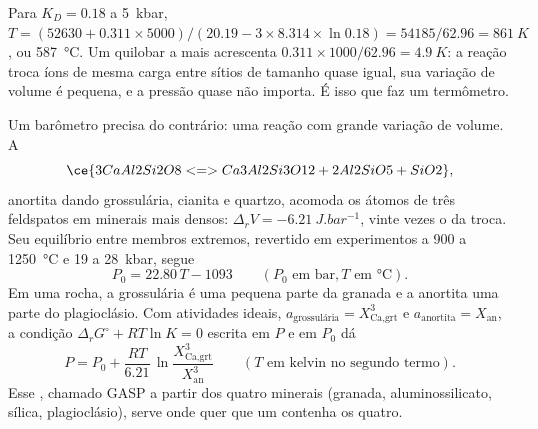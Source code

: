\begin{omfigure}
\centering
{}
\par{}
\end{omfigure}

Para $K_D = 0.18$ a \qty{5}{kbar}, $T = (52630 + 0.311\times5000)/(20.19 - 3\times8.314
\times\ln 0.18) = 54185/62.96 = \qty{861}{K}$, ou \qty{587}{\celsius}. Um quilobar a mais
acrescenta $0.311\times1000/62.96 = \qty{4.9}{K}$: a reação troca íons de mesma carga
entre sítios de tamanho quase igual, sua variação de volume é pequena, e a pressão quase não
importa. É isso que faz um termômetro.

Um barômetro precisa do contrário: uma reação com grande variação de volume. A 
\[
\ce{3 CaAl2Si2O8 <=> Ca3Al2Si3O12 + 2 Al2SiO5 + SiO2},
\]
anortita dando grossulária, cianita e quartzo, acomoda os átomos de três feldspatos em
minerais mais densos: $\Delta_r V = \qty{-6.21}{J.bar^{-1}}$, vinte vezes o da troca.
Seu equilíbrio entre membros extremos, revertido em experimentos a 900 a \qty{1250}{\celsius} e 19
a \qty{28}{kbar}, segue
\[
P_0 = 22.80\,T - 1093 \qquad (P_0 \text{ em bar}, T \text{ em } \unit{\celsius}).
\]
Em uma rocha, a grossulária é uma pequena parte da granada e a anortita uma parte do
plagioclásio. Com atividades ideais, $a_{\text{grossulária}} = X_{\text{Ca,grt}}^3$ e
$a_{\text{anortita}} = X_{\text{an}}$, a condição $\Delta_r G^\circ + RT\ln K = 0$
escrita em $P$ e em $P_0$ dá
\[
P = P_0 + \frac{RT}{6.21}\,\ln\frac{X_{\text{Ca,grt}}^3}{X_{\text{an}}^3}
\qquad (T \text{ em kelvin no segundo termo}).
\]
Esse , chamado GASP a partir dos quatro minerais (granada, aluminossilicato, sílica,
plagioclásio), serve onde quer que um  contenha os quatro.

